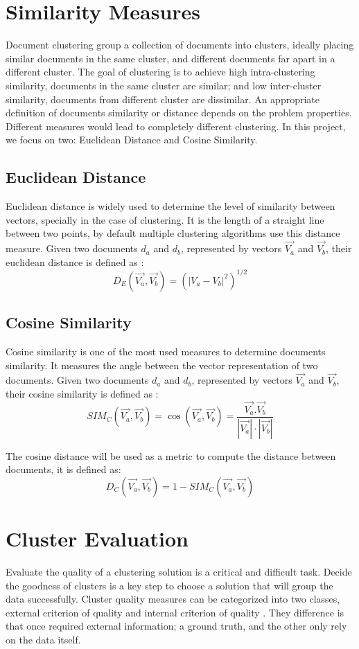\section{Similarity Measures}
\label{sec:similarities}

Document clustering group a collection of documents into clusters, ideally placing similar documents in the same cluster, and different documents far apart in a different cluster. The goal of clustering is to achieve high intra-clustering similarity, documents in the same cluster are similar; and low inter-cluster similarity, documents from different cluster are dissimilar\cite{manning2008introduction}. An appropriate definition of documents similarity or distance depends on the problem properties\cite{similarity.mes}. Different measures would lead to completely different clustering. In this project, we focus on two: Euclidean Distance and Cosine Similarity.

\subsection{Euclidean Distance}
\label{sec:euclidean}

Euclidean distance is widely used to determine the level of similarity between vectors, specially in the case of clustering. It is the  length of a straight line between two points, by default multiple clustering algorithms use this distance measure. Given two documents $d_a$ and $d_b$, represented by vectors $\vec{V_a}$ and $\vec{V_b}$, their euclidean distance is defined as \cite{similarity.mes}:
$$D_E(\vec{V_a},\vec{V_b})=(|V_a - V_b|^2)^{1/2}$$
\subsection{Cosine Similarity}
Cosine similarity is one of the most used measures to determine documents similarity. It measures the angle between the vector representation of two documents. Given two documents $d_a$ and $d_b$, represented by vectors $\vec{V_a}$ and $\vec{V_b}$, their cosine similarity is defined as \cite{similarity.mes}:
$$SIM_C(\vec{V_a},\vec{V_b})= \cos({\vec{V_a},\vec{V_b}}) = \frac{\vec{V_a}.\vec{V_b}}{|\vec{V_a}|\cdot |\vec{V_b}|}$$

The cosine distance will be used as a metric to compute the distance between documents, it is defined as:
$$ D_C(\vec{V_a},\vec{V_b}) = 1 - SIM_C(\vec{V_a},\vec{V_b})$$
\section{Cluster Evaluation}
Evaluate the quality of a clustering solution is a critical and difficult task. Decide the goodness of clusters is a key step to choose a solution that will group the data successfully. Cluster quality measures can be categorized into two classes, external criterion of quality and internal criterion of quality \cite{manning2008introduction}. They difference is that once required external information; a ground truth, and the other only rely on the data itself. 

